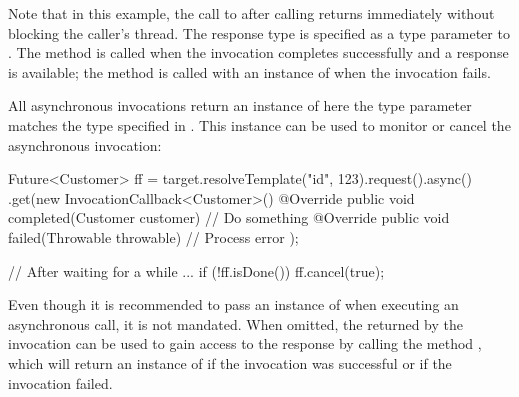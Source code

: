 Note that in this example, the call to  after calling  returns immediately without blocking the caller's thread.
The response type is specified as a type parameter to . The method  is called when the invocation completes successfully and a response is available; the method  is called with an instance of  when the invocation fails.

All asynchronous invocations return an instance of  here the type parameter  matches the type specified in . This instance can be used to monitor or cancel the asynchronous invocation:

\begin{listing}{1}
Future<Customer> ff = target.resolveTemplate("id", 123).request().async()
    .get(new InvocationCallback<Customer>() {
        @Override
        public void completed(Customer customer) {
            // Do something
        }
        @Override
        public void failed(Throwable throwable) {
            // Process error
        }
    });

// After waiting for a while ...
if (!ff.isDone()) {
    ff.cancel(true);
} 
\end{listing}

Even though it is recommended to pass an instance of  when executing an asynchronous call, it is not mandated. When omitted, the  returned by the invocation can be used to gain access to the response by calling the method , which will return an instance of  if the invocation was successful or  if the invocation failed.






